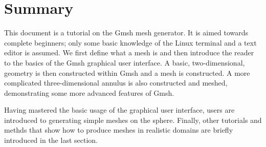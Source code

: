 \section*{Summary}\small
This document is a tutorial on the Gmsh mesh generator. It is aimed towards complete beginners; only
some basic knowledge of the Linux terminal and a text editor is assumed. We first define what a mesh
is and then introduce the reader to the basics of the Gmsh graphical user interface. A basic,
two-dimensional, geometry is then constructed within Gmsh and a mesh is constructed. A more
complicated three-dimensional annulus is also constructed and meshed, demonstrating some
more advanced features of Gmsh.

Having mastered the basic usage of the graphical user interface, users are introduced to generating
simple meshes on the sphere. Finally, other tutorials and methds that show how to produce
meshes in realistic domains are briefly introduced in the last section.
